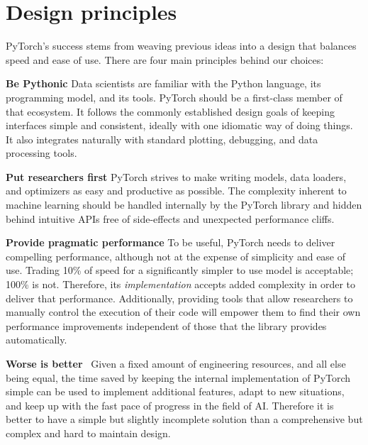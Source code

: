 \section{Design principles}

PyTorch's success stems from weaving previous ideas into a design that balances speed and ease of use. There are four main principles behind our choices:

\textbf{Be Pythonic} \quad
Data scientists are familiar with the Python language, its programming model, and its tools. PyTorch should be a first-class member of that ecosystem. It follows the commonly established design goals of keeping interfaces simple and consistent, ideally with one idiomatic way of doing things. It also integrates naturally with standard plotting, debugging, and data processing tools.

\textbf{Put researchers first} \quad PyTorch strives to make writing models, data loaders, and optimizers as easy and productive as possible. The complexity inherent to machine learning should be handled internally by the PyTorch library and hidden behind intuitive APIs free of  side-effects and unexpected performance cliffs.

\textbf{Provide pragmatic performance} \quad
To be useful, PyTorch needs to deliver compelling performance, although not at the expense of simplicity and ease of use. Trading 10\% of speed for a significantly simpler to use model is acceptable; 100\% is not. Therefore, its \emph{implementation} accepts added complexity in order to deliver that performance. Additionally, providing tools that allow researchers to manually control the execution of their code will empower them to find their own performance improvements independent of those that the library provides automatically.

\textbf{Worse is better}~\cite{worse_is_better} \quad
Given a fixed amount of engineering resources, and all else being equal, the time saved by keeping the internal implementation of PyTorch simple can be used to implement additional features, adapt to new situations, and keep up with the fast pace of progress in the field of AI. Therefore it is better to have a simple but slightly incomplete solution than a comprehensive but complex and hard to maintain design.
